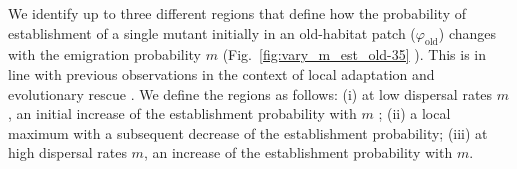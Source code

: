 \documentclass[11pt]{article}
\begin{document}

We identify up to three different regions that define how the probability of establishment of a single mutant initially in an old-habitat patch ($\varphi_{\text{old}}$) changes with the emigration probability $m$ (Fig.~\ref{fig:vary_m_est_old-35} ). This is in line with previous observations in the context of local adaptation \citep[e.g.][]{kawecki_1995,tomasini_2018} and evolutionary rescue \citep{uecker_2014}. We define the regions as follows: (i) at low dispersal rates $m$, an initial increase of the establishment probability with $m$ ; (ii) a local maximum with a subsequent decrease of the establishment probability; (iii) at high dispersal rates $m$, an increase of the establishment probability with $m$.
\end{document}
